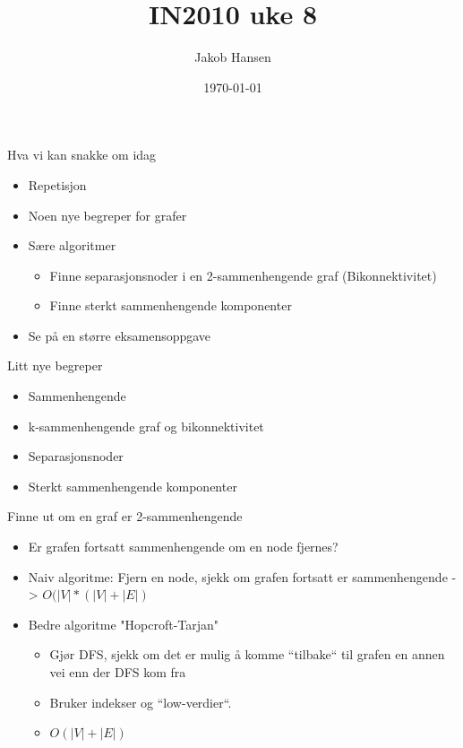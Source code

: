 \documentclass[norsk, handout]{beamer}
\title{IN2010 uke 8}
\author{Jakob Hansen}
\date{\today}
\begin{document}
	\frame{\titlepage}
	\begin{frame}{Hva vi kan snakke om idag}
		\begin{itemize}
			\item Repetisjon
			\item Noen nye begreper for grafer
			\item Sære algoritmer
				\begin{itemize}
					\item Finne separasjonsnoder i en 2-sammenhengende graf (Bikonnektivitet)
					\item Finne sterkt sammenhengende komponenter
				\end{itemize}
			\item Se på en større eksamensoppgave
		\end{itemize}
    \end{frame}

	\begin{frame}{Litt nye begreper}
		\begin{itemize}
			\item Sammenhengende
			\item k-sammenhengende graf og bikonnektivitet
			\item Separasjonsnoder
			\item Sterkt sammenhengende komponenter
		\end{itemize}
	\end{frame}

	\begin{frame}{Finne ut om en graf er 2-sammenhengende}
		\begin{itemize}
			\item Er grafen fortsatt sammenhengende om en node fjernes?
			\item Naiv algoritme: Fjern en node, sjekk om grafen fortsatt er sammenhengende -> $O(|V|*(|V| + |E|)$
			\item Bedre algoritme "Hopcroft-Tarjan"
				\begin{itemize}
					\item Gjør DFS, sjekk om det er mulig å komme ``tilbake`` til grafen en annen
						vei enn der DFS kom fra
					\item Bruker indekser og ``low-verdier``.
					\item $O(|V| + |E|)$
				\end{itemize}
		\end{itemize}
	\end{frame}
\end{document}
